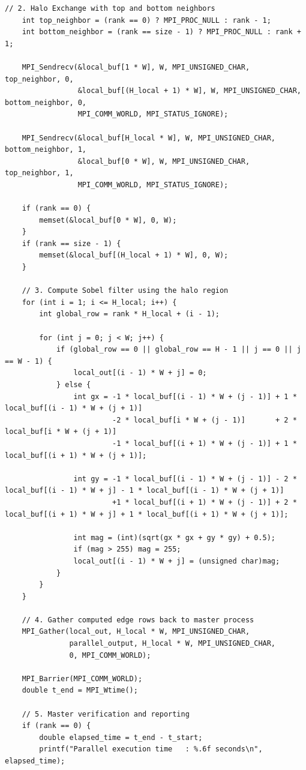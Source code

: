 \documentclass[12pt]{article}
\begin{document}
\begin{lstlisting}[style=code]
    // 2. Halo Exchange with top and bottom neighbors
    int top_neighbor = (rank == 0) ? MPI_PROC_NULL : rank - 1;
    int bottom_neighbor = (rank == size - 1) ? MPI_PROC_NULL : rank + 1;

    MPI_Sendrecv(&local_buf[1 * W], W, MPI_UNSIGNED_CHAR, top_neighbor, 0,
                 &local_buf[(H_local + 1) * W], W, MPI_UNSIGNED_CHAR, bottom_neighbor, 0,
                 MPI_COMM_WORLD, MPI_STATUS_IGNORE);

    MPI_Sendrecv(&local_buf[H_local * W], W, MPI_UNSIGNED_CHAR, bottom_neighbor, 1,
                 &local_buf[0 * W], W, MPI_UNSIGNED_CHAR, top_neighbor, 1,
                 MPI_COMM_WORLD, MPI_STATUS_IGNORE);

    if (rank == 0) {
        memset(&local_buf[0 * W], 0, W);
    }
    if (rank == size - 1) {
        memset(&local_buf[(H_local + 1) * W], 0, W);
    }

    // 3. Compute Sobel filter using the halo region
    for (int i = 1; i <= H_local; i++) {
        int global_row = rank * H_local + (i - 1);

        for (int j = 0; j < W; j++) {
            if (global_row == 0 || global_row == H - 1 || j == 0 || j == W - 1) {
                local_out[(i - 1) * W + j] = 0;
            } else {
                int gx = -1 * local_buf[(i - 1) * W + (j - 1)] + 1 * local_buf[(i - 1) * W + (j + 1)]
                         -2 * local_buf[i * W + (j - 1)]       + 2 * local_buf[i * W + (j + 1)]
                         -1 * local_buf[(i + 1) * W + (j - 1)] + 1 * local_buf[(i + 1) * W + (j + 1)];

                int gy = -1 * local_buf[(i - 1) * W + (j - 1)] - 2 * local_buf[(i - 1) * W + j] - 1 * local_buf[(i - 1) * W + (j + 1)]
                         +1 * local_buf[(i + 1) * W + (j - 1)] + 2 * local_buf[(i + 1) * W + j] + 1 * local_buf[(i + 1) * W + (j + 1)];

                int mag = (int)(sqrt(gx * gx + gy * gy) + 0.5);
                if (mag > 255) mag = 255;
                local_out[(i - 1) * W + j] = (unsigned char)mag;
            }
        }
    }

    // 4. Gather computed edge rows back to master process
    MPI_Gather(local_out, H_local * W, MPI_UNSIGNED_CHAR,
               parallel_output, H_local * W, MPI_UNSIGNED_CHAR,
               0, MPI_COMM_WORLD);

    MPI_Barrier(MPI_COMM_WORLD);
    double t_end = MPI_Wtime();

    // 5. Master verification and reporting
    if (rank == 0) {
        double elapsed_time = t_end - t_start;
        printf("Parallel execution time   : %.6f seconds\n", elapsed_time);


\end{lstlisting}
\end{document}
